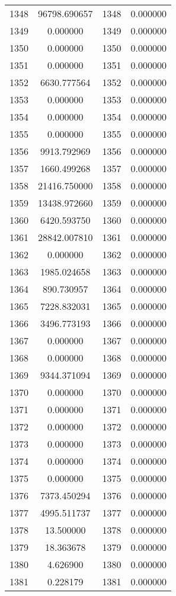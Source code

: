 \documentclass[12pt]{article}
\begin{document}
\begin{longtable}{@{}cccc@{}}
1348 & 96798.690657 & 1348 & 0.000000 \\
1349 & 0.000000 & 1349 & 0.000000 \\
1350 & 0.000000 & 1350 & 0.000000 \\
1351 & 0.000000 & 1351 & 0.000000 \\
1352 & 6630.777564 & 1352 & 0.000000 \\
1353 & 0.000000 & 1353 & 0.000000 \\
1354 & 0.000000 & 1354 & 0.000000 \\
1355 & 0.000000 & 1355 & 0.000000 \\
1356 & 9913.792969 & 1356 & 0.000000 \\
1357 & 1660.499268 & 1357 & 0.000000 \\
1358 & 21416.750000 & 1358 & 0.000000 \\
1359 & 13438.972660 & 1359 & 0.000000 \\
1360 & 6420.593750 & 1360 & 0.000000 \\
1361 & 28842.007810 & 1361 & 0.000000 \\
1362 & 0.000000 & 1362 & 0.000000 \\
1363 & 1985.024658 & 1363 & 0.000000 \\
1364 & 890.730957 & 1364 & 0.000000 \\
1365 & 7228.832031 & 1365 & 0.000000 \\
1366 & 3496.773193 & 1366 & 0.000000 \\
1367 & 0.000000 & 1367 & 0.000000 \\
1368 & 0.000000 & 1368 & 0.000000 \\
1369 & 9344.371094 & 1369 & 0.000000 \\
1370 & 0.000000 & 1370 & 0.000000 \\
1371 & 0.000000 & 1371 & 0.000000 \\
1372 & 0.000000 & 1372 & 0.000000 \\
1373 & 0.000000 & 1373 & 0.000000 \\
1374 & 0.000000 & 1374 & 0.000000 \\
1375 & 0.000000 & 1375 & 0.000000 \\
1376 & 7373.450294 & 1376 & 0.000000 \\
1377 & 4995.511737 & 1377 & 0.000000 \\
1378 & 13.500000 & 1378 & 0.000000 \\
1379 & 18.363678 & 1379 & 0.000000 \\
1380 & 4.626900 & 1380 & 0.000000 \\
1381 & 0.228179 & 1381 & 0.000000 \\

\end{longtable}
\end{document}
